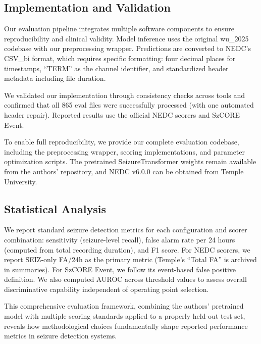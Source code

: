 \hypertarget{implementation-and-validation}{%
\subsection{Implementation and
Validation}\label{implementation-and-validation}}

Our evaluation pipeline integrates multiple software components to
ensure reproducibility and clinical validity. Model inference uses the
original wu\_2025 codebase with our preprocessing wrapper. Predictions
are converted to NEDC's CSV\_bi format, which requires specific
formatting: four decimal places for timestamps, ``TERM'' as the channel
identifier, and standardized header metadata including file duration.

We validated our implementation through consistency checks across tools
and confirmed that all 865 eval files were successfully processed (with
one automated header repair). Reported results use the official NEDC
scorers and SzCORE Event.

To enable full reproducibility, we provide our complete evaluation
codebase, including the preprocessing wrapper, scoring implementations,
and parameter optimization scripts. The pretrained SeizureTransformer
weights remain available from the authors' repository, and NEDC v6.0.0
can be obtained from Temple University.

\hypertarget{statistical-analysis}{%
\subsection{Statistical Analysis}\label{statistical-analysis}}

We report standard seizure detection metrics for each configuration and
scorer combination: sensitivity (seizure-level recall), false alarm rate
per 24 hours (computed from total recording duration), and F1 score. For
NEDC scorers, we report SEIZ-only FA/24h as the primary metric (Temple's
``Total FA'' is archived in summaries). For SzCORE Event, we follow its
event-based false positive definition. We also computed AUROC across
threshold values to assess overall discriminative capability independent
of operating point selection.

This comprehensive evaluation framework, combining the authors'
pretrained model with multiple scoring standards applied to a properly
held-out test set, reveals how methodological choices fundamentally
shape reported performance metrics in seizure detection systems.

